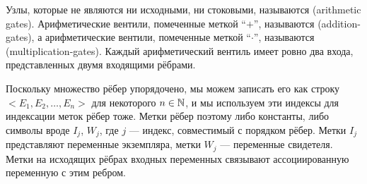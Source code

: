 Узлы, которые не являются ни исходными, ни стоковыми, называются  (arithmetic gates). Арифметические вентили, помеченные меткой ``$+$'', называются  (addition-gates), а арифметические вентили, помеченные меткой ``$\cdot$'', называются  (multiplication-gates). Каждый арифметический вентиль имеет ровно два входа, представленных двумя входящими рёбрами.

Поскольку множество рёбер упорядочено, мы можем записать его как строку $<E_1,E_2,\ldots, E_n>$ для некоторого $n\in \mathbb{N}$, и мы используем эти индексы для индексации меток рёбер тоже. Метки рёбер поэтому либо константы, либо символы вроде $I_j$, $W_j$, где $j$ — индекс, совместимый с порядком рёбер. Метки $I_j$ представляют переменные экземпляра, метки $W_j$ — переменные свидетеля. Метки на исходящих рёбрах входных переменных связывают ассоциированную переменную с этим ребром.

